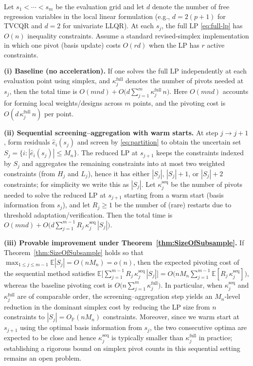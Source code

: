 \documentclass[lineno]{biometrika}
\begin{document}
\begin{proposition}
\label{prop:complexity}
Let $s_1<\cdots<s_m$ be the evaluation grid and let $d$ denote the number of free regression variables in the local linear formulation (e.g., $d=2(p+1)$ for TVCQR and $d=2$ for univariate LLQR). 
At each $s_j$, the full LP \eqref{eq:full-lp} has $O(n)$ inequality constraints. 
Assume a standard revised-simplex implementation in which one pivot (basis update) costs $O(rd)$ when the LP has $r$ active constraints.

\smallskip
\noindent\textbf{(i) Baseline (no acceleration).}
If one solves the full LP independently at each evaluation point using simplex, and $\kappa^{\mathrm{full}}_j$ denotes the number of pivots needed at $s_j$, then the total time is
$O(mnd)+O\big(d\sum_{j=1}^m \kappa^{\mathrm{full}}_j\,n\big)$.
Here $O(mnd)$ accounts for forming local weights/designs across $m$ points, and the pivoting cost is $O(d\,\kappa^{\mathrm{full}}_j\,n)$ per point.

\smallskip
\noindent\textbf{(ii) Sequential screening--aggregation with warm starts.}
At step $j\to j{+}1$, form residuals $\hat e_i(s_j)$ and screen by \eqref{eq:partition} to obtain the uncertain set $S_j=\{i:|\hat e_i(s_j)|\le M_n\}$. 
The reduced LP at $s_{j+1}$ keeps the constraints indexed by $S_j$ and aggregates the remaining constraints into at most two weighted constraints (from $H_j$ and $L_j$), hence it has either $|S_j|$, $|S_j|+1$, or $|S_j|+2$ constraints; for simplicity we write this as $|S_j|$. 
Let $\kappa^{\mathrm{seq}}_j$ be the number of pivots needed to solve the reduced LP at $s_{j+1}$ starting from a warm start (basis information from $s_j$), and let $R_j\ge1$ be the number of (rare) restarts due to threshold adaptation/verification. 
Then the total time is
$O(mnd)+O\big(d\sum_{j=1}^{m-1} R_j\,\kappa^{\mathrm{seq}}_j\,|S_j|\big)$.

\smallskip
\noindent\textbf{(iii) Provable improvement under Theorem~\ref{thm:SizeOfSubsample}.}
If Theorem~\ref{thm:SizeOfSubsample} holds so that $\max_{1\le j\le m-1}\mathbb E|S_j|=O(nM_n)=o(n)$, then the expected pivoting cost of the sequential method satisfies
$\mathbb E\big[\sum_{j=1}^{m-1} R_j\,\kappa^{\mathrm{seq}}_j\,|S_j|\big]
=O\big(nM_n\sum_{j=1}^{m-1}\mathbb E[R_j\,\kappa^{\mathrm{seq}}_j]\big)$,
whereas the baseline pivoting cost is $O\big(n\sum_{j=1}^m \kappa^{\mathrm{full}}_j\big)$.
In particular, when $\kappa^{\mathrm{seq}}_j$ and $\kappa^{\mathrm{full}}_j$ are of comparable order, the screening--aggregation step yields an $M_n$-level reduction in the dominant simplex cost by reducing the LP size from $n$ constraints to $|S_j|=O_{\mathbb P}(nM_n)$ constraints.
Moreover, since we warm start at $s_{j+1}$ using the optimal basis information from $s_j$, the two consecutive optima are expected to be close and hence $\kappa^{\mathrm{seq}}_j$ is typically smaller than $\kappa^{\mathrm{full}}_j$ in practice; establishing a rigorous bound on simplex pivot counts in this sequential setting remains an open problem.
\end{proposition}
\end{document}
